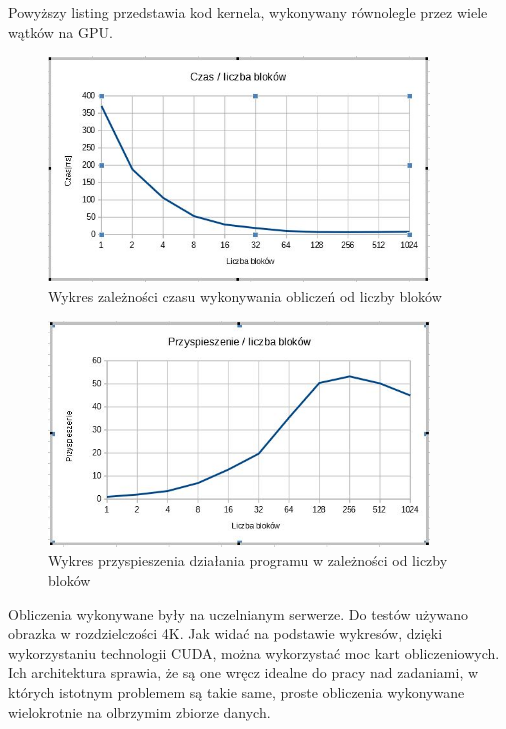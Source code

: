 \documentclass[a4paper,12pt]{article}
\begin{document}
Powyższy listing przedstawia kod kernela, wykonywany równolegle przez wiele wątków na GPU.

\begin{figure}[!ht]
	\centering
  \includegraphics[width=0.9\textwidth]{wykresCzas.jpg}
  \caption{Wykres zależności czasu wykonywania obliczeń od liczby bloków}
\end{figure}

\begin{figure}[!ht]
	\centering
  \includegraphics[width=0.9\textwidth]{wykresPrzyspieszenie.jpg}
  \caption{Wykres przyspieszenia działania programu w zależności od liczby bloków}
\end{figure}


Obliczenia wykonywane były na uczelnianym serwerze. Do testów używano obrazka w rozdzielczości 4K. Jak widać na podstawie wykresów, dzięki wykorzystaniu technologii CUDA, można wykorzystać moc kart obliczeniowych. Ich architektura sprawia, że są one wręcz idealne do pracy nad zadaniami, w których istotnym problemem są takie same, proste obliczenia wykonywane wielokrotnie na olbrzymim zbiorze danych.
\end{document}
